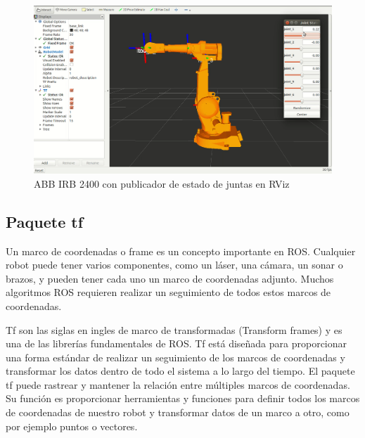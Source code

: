         
        \begin{figure}[htb]
            \centering
            \includegraphics[width=0.9\linewidth]{Main/Chapter3/Images3/interfaz-rviz.png}
            \caption{ABB IRB 2400 con publicador de estado de juntas en RViz \cite{lentin_20188}}
            \label{f:Cap3-6_interfaz_rviz}
        \end{figure}
        
        \newpage
    
    \subsection{Paquete tf}
    
        Un marco de coordenadas o frame es un concepto importante en ROS. Cualquier robot puede tener varios componentes, como un láser, una cámara, un sonar o brazos, y pueden tener cada uno un marco de coordenadas adjunto. Muchos algoritmos ROS requieren realizar un seguimiento de todos estos marcos de coordenadas.
        
        Tf son las siglas en ingles de marco de transformadas (Transform frames) y es una de las librerías fundamentales de ROS. Tf está diseñada para proporcionar una forma estándar de realizar un seguimiento de los marcos de coordenadas y transformar los datos dentro de todo el sistema a lo largo del tiempo. El paquete tf puede rastrear y mantener la relación entre múltiples marcos de coordenadas. Su función es proporcionar herramientas y funciones para definir todos los marcos de coordenadas de nuestro robot y transformar datos de un marco a otro, como por ejemplo puntos o vectores.
        
